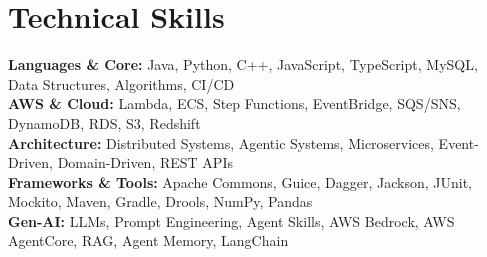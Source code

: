 
\section{Technical Skills}
    \begin{itemize}[leftmargin=0.15in, label={}]
	\small{\item{
    \textbf{Languages \& Core:} Java, Python, C++, JavaScript, TypeScript, MySQL, Data Structures, Algorithms, CI/CD \\[4pt]
    \textbf{AWS \& Cloud:} Lambda, ECS, Step Functions, EventBridge, SQS/SNS, DynamoDB, RDS, S3, Redshift  \\[4pt]
    \textbf{Architecture:} Distributed Systems, Agentic Systems, Microservices, Event-Driven, Domain-Driven, REST APIs\\[4pt]
    \textbf{Frameworks \& Tools:} Apache Commons, Guice, Dagger, Jackson, JUnit, Mockito, Maven, Gradle, Drools, NumPy, Pandas \\[4pt]
     \textbf{Gen-AI:} LLMs, Prompt Engineering, Agent Skills, AWS Bedrock, AWS AgentCore, RAG, Agent Memory, LangChain  \\
    }}
    \end{itemize}
